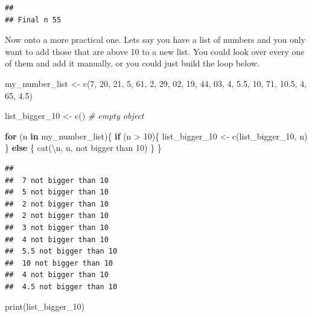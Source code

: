 \documentclass[
]{book}
\newenvironment{Shaded}{\begin{snugshade}}{\end{snugshade}}
\newcommand{\CommentTok}[1]{\textcolor[rgb]{0.56,0.35,0.01}{\textit{#1}}}
\newcommand{\ControlFlowTok}[1]{\textcolor[rgb]{0.13,0.29,0.53}{\textbf{#1}}}
\newcommand{\DecValTok}[1]{\textcolor[rgb]{0.00,0.00,0.81}{#1}}
\newcommand{\FloatTok}[1]{\textcolor[rgb]{0.00,0.00,0.81}{#1}}
\newcommand{\FunctionTok}[1]{\textcolor[rgb]{0.00,0.00,0.00}{#1}}
\newcommand{\NormalTok}[1]{#1}
\newcommand{\OtherTok}[1]{\textcolor[rgb]{0.56,0.35,0.01}{#1}}
\newcommand{\SpecialCharTok}[1]{\textcolor[rgb]{0.00,0.00,0.00}{#1}}
\newcommand{\StringTok}[1]{\textcolor[rgb]{0.31,0.60,0.02}{#1}}
\begin{document}
\begin{verbatim}
## 
## Final n 55
\end{verbatim}

Now onto a more practical one. Lets say you have a list of numbers and you only
want to add those that are above 10 to a new list. You could look over every one of them and add it manually, or you could just build the loop below.

\begin{Shaded}
\begin{Highlighting}[]
\NormalTok{my\_number\_list }\OtherTok{\textless{}{-}} \FunctionTok{c}\NormalTok{(}\DecValTok{7}\NormalTok{, }\DecValTok{20}\NormalTok{, }\DecValTok{21}\NormalTok{, }\DecValTok{5}\NormalTok{, }\DecValTok{61}\NormalTok{, }\DecValTok{2}\NormalTok{, }\DecValTok{29}\NormalTok{, }\DecValTok{02}\NormalTok{, }\DecValTok{19}\NormalTok{, }\DecValTok{44}\NormalTok{,}
                    \DecValTok{03}\NormalTok{, }\DecValTok{4}\NormalTok{, }\FloatTok{5.5}\NormalTok{, }\DecValTok{10}\NormalTok{, }\DecValTok{71}\NormalTok{, }\FloatTok{10.5}\NormalTok{, }\DecValTok{4}\NormalTok{, }\DecValTok{65}\NormalTok{, }\FloatTok{4.5}\NormalTok{)}

\NormalTok{list\_bigger\_10 }\OtherTok{\textless{}{-}} \FunctionTok{c}\NormalTok{() }\CommentTok{\# empty object }

\ControlFlowTok{for}\NormalTok{ (n }\ControlFlowTok{in}\NormalTok{ my\_number\_list)\{}
  \ControlFlowTok{if}\NormalTok{ (n }\SpecialCharTok{\textgreater{}} \DecValTok{10}\NormalTok{)\{}
\NormalTok{    list\_bigger\_10 }\OtherTok{\textless{}{-}} \FunctionTok{c}\NormalTok{(list\_bigger\_10, n)}
\NormalTok{  \} }\ControlFlowTok{else}\NormalTok{ \{}
    \FunctionTok{cat}\NormalTok{(}\StringTok{\textquotesingle{}}\SpecialCharTok{\textbackslash{}n}\StringTok{\textquotesingle{}}\NormalTok{, n, }\StringTok{\textquotesingle{}not bigger than 10\textquotesingle{}}\NormalTok{)}
\NormalTok{  \}}
\NormalTok{\}}
\end{Highlighting}
\end{Shaded}

\begin{verbatim}
## 
##  7 not bigger than 10
##  5 not bigger than 10
##  2 not bigger than 10
##  2 not bigger than 10
##  3 not bigger than 10
##  4 not bigger than 10
##  5.5 not bigger than 10
##  10 not bigger than 10
##  4 not bigger than 10
##  4.5 not bigger than 10
\end{verbatim}

\begin{Shaded}
\begin{Highlighting}[]
\FunctionTok{print}\NormalTok{(list\_bigger\_10)}
\end{Highlighting}
\end{Shaded}
\end{document}
